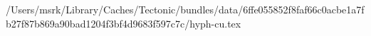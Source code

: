 /Users/msrk/Library/Caches/Tectonic/bundles/data/6ffe055852f8faf66c0acbe1a7fb27f87b869a90bad1204f3bf4d9683f597c7c/hyph-cu.tex